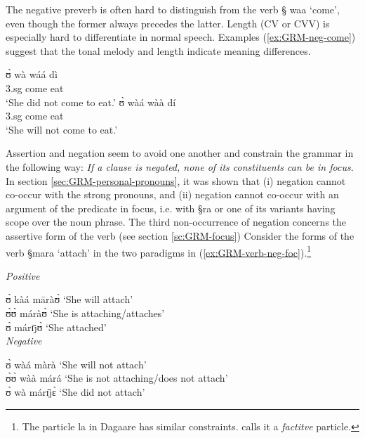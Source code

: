 The negative preverb is often hard to distinguish from the verb  {\S
waa} `come',  even though the former always precedes the latter. Length (CV or
CVV) is especially hard to differentiate in normal speech. Examples
(\ref{ex:GRM-neg-come}) suggest that the tonal melody and length  indicate
meaning differences.


\begin{exe}
\ex\label{ex:GRM-neg-come}
 \begin{xlist}
  
\ex\label{}
\gll ʊ̀ wà wáá dì\\
{\sc 3.sg} {\neg} come eat\\
\glt `She did not come to eat.'
\ex\label{}
\gll ʊ̀ wàá wàà dí\\
{\sc 3.sg} {\neg} come eat \\
\glt `She will not come to eat.'
\end{xlist}
\end{exe}

Assertion and negation seem to avoid one another and constrain the grammar  in
the following way:  {\it If a clause is negated,  none of its constituents can
be in focus.} In section \ref{sec:GRM-personal-pronouns},  it was shown that (i)
negation cannot co-occur with the strong pronouns, and (ii) negation cannot
co-occur with an argument of the predicate in focus, i.e. with {\S ra} or one of
its variants having scope over the noun phrase. The third non-occurrence of
negation concerns  the assertive form of the verb (see section
\ref{sc:GRM-focus})  Consider the forms of the verb {\S mara} `attach' in the
two paradigms in (\ref{ex:GRM-verb-neg-foc}).\footnote{The particle {\F la} in
Dagaare has similar constraints. \citet[94]{Bodo97} calls it a {\it factitve}
particle.}

\begin{exe}
   \ex\label{ex:GRM-verb-neg-foc}
\begin{xlist}
   \ex\label{ex:GRM-verb-neg-foc-pos}{\it Positive}

 ʊ̀ kàá māràʊ̀   `She will attach'\\
  ʊ̀ʊ̀ máràʊ̀     	 `She  is attaching/attaches'\\
  ʊ̀ márɪ̄jʊ̀       `She   attached'\\
  \ex\label{ex:GRM-verb-neg-foc-neg}{\it Negative}

 ʊ̀ wàá màrà  `She will not attach'\\
   ʊ̀ʊ̀ wàà márá  	 `She  is  not attaching/does not attach'\\
  ʊ̀ wà márɪ̄jɛ̀   `She   did not attach'\\

\end{xlist}
\end{exe}

